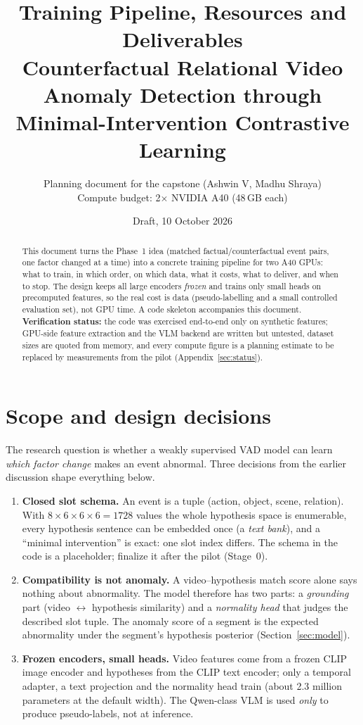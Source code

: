 \documentclass[11pt,a4paper]{article}
\title{\textbf{Training Pipeline, Resources and Deliverables}\\[2pt]
\large Counterfactual Relational Video Anomaly Detection through\\ Minimal-Intervention Contrastive Learning}
\author{Planning document for the capstone (Ashwin V, Madhu Shraya)\\
Compute budget: 2$\times$ NVIDIA A40 (48\,GB each)}
\date{Draft, 10 October 2026}
\begin{document}
\maketitle

\begin{abstract}
\noindent This document turns the Phase~1 idea (matched factual/counterfactual event pairs, one factor changed at a time) into a concrete training pipeline for two A40 GPUs: what to train, in which order, on which data, what it costs, what to deliver, and when to stop. The design keeps all large encoders \emph{frozen} and trains only small heads on precomputed features, so the real cost is data (pseudo-labelling and a small controlled evaluation set), not GPU time. A code skeleton accompanies this document. \textbf{Verification status:} the code was exercised end-to-end only on synthetic features; GPU-side feature extraction and the VLM backend are written but untested, dataset sizes are quoted from memory, and every compute figure is a planning estimate to be replaced by measurements from the pilot (Appendix~\ref{sec:status}).
\end{abstract}

\section{Scope and design decisions}
The research question is whether a weakly supervised VAD model can learn \emph{which factor change} makes an event abnormal. Three decisions from the earlier discussion shape everything below.

\begin{enumerate}
\item \textbf{Closed slot schema.} An event is a tuple (action, object, scene, relation). With $8\times6\times6\times6=1728$ values the whole hypothesis space is enumerable, every hypothesis sentence can be embedded once (a \emph{text bank}), and a ``minimal intervention'' is exact: one slot index differs. The schema in the code is a placeholder; finalize it after the pilot (Stage~0).
\item \textbf{Compatibility is not anomaly.} A video--hypothesis match score alone says nothing about abnormality. The model therefore has two parts: a \emph{grounding} part (video $\leftrightarrow$ hypothesis similarity) and a \emph{normality head} that judges the described slot tuple. The anomaly score of a segment is the expected abnormality under the segment's hypothesis posterior (Section~\ref{sec:model}).
\item \textbf{Frozen encoders, small heads.} Video features come from a frozen CLIP image encoder and hypotheses from the CLIP text encoder; only a temporal adapter, a text projection and the normality head train (about 2.3 million parameters at the default width). The Qwen-class VLM is used \emph{only} to produce pseudo-labels, not at inference.
\end{enumerate}
\end{document}
